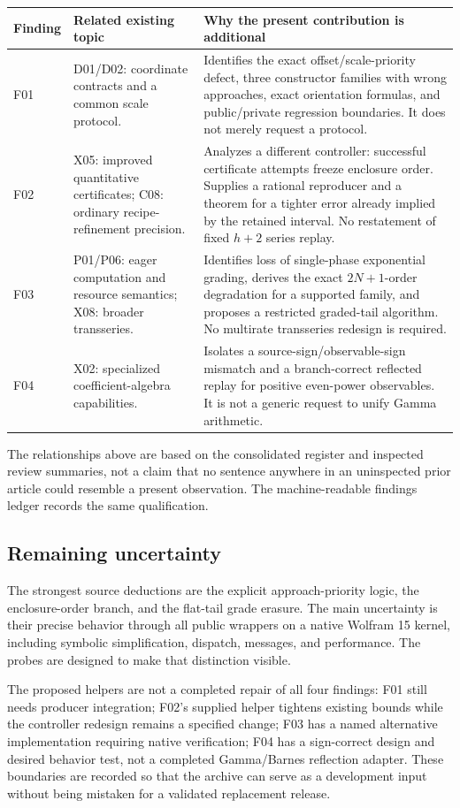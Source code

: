 \begin{longtable}{@{}R{0.09\textwidth}R{0.27\textwidth}R{0.56\textwidth}@{}}\toprule
Finding & Related existing topic & Why the present contribution is additional\\\midrule\endhead
F01 & D01/D02: coordinate contracts and a common scale protocol. & Identifies the exact offset/scale-priority defect, three constructor families with wrong approaches, exact orientation formulas, and public/private regression boundaries. It does not merely request a protocol.\\[0.6em]
F02 & X05: improved quantitative certificates; C08: ordinary recipe-refinement precision. & Analyzes a different controller: successful certificate attempts freeze enclosure order. Supplies a rational reproducer and a theorem for a tighter error already implied by the retained interval. No restatement of fixed $h+2$ series replay.\\[0.6em]
F03 & P01/P06: eager computation and resource semantics; X08: broader transseries. & Identifies loss of single-phase exponential grading, derives the exact $2N+1$-order degradation for a supported family, and proposes a restricted graded-tail algorithm. No multirate transseries redesign is required.\\[0.6em]
F04 & X02: specialized coefficient-algebra capabilities. & Isolates a source-sign/observable-sign mismatch and a branch-correct reflected replay for positive even-power observables. It is not a generic request to unify Gamma arithmetic.\\\bottomrule
\end{longtable}

The relationships above are based on the consolidated register and inspected review summaries, not a claim that no sentence anywhere in an uninspected prior article could resemble a present observation. The machine-readable findings ledger records the same qualification.\cite{status,review6,review7,review8,review9}

\subsection{Remaining uncertainty}

The strongest source deductions are the explicit approach-priority logic, the enclosure-order branch, and the flat-tail grade erasure. The main uncertainty is their precise behavior through all public wrappers on a native Wolfram 15 kernel, including symbolic simplification, dispatch, messages, and performance. The probes are designed to make that distinction visible.

The proposed helpers are not a completed repair of all four findings: F01 still needs producer integration; F02's supplied helper tightens existing bounds while the controller redesign remains a specified change; F03 has a named alternative implementation requiring native verification; F04 has a sign-correct design and desired behavior test, not a completed Gamma/Barnes reflection adapter. These boundaries are recorded so that the archive can serve as a development input without being mistaken for a validated replacement release.

